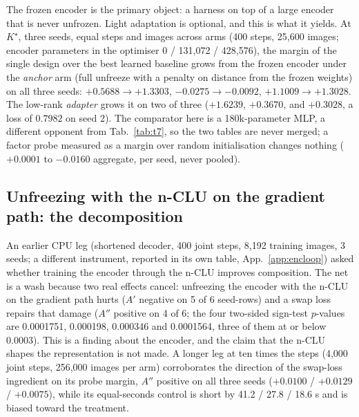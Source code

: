 \documentclass{article} %
\newcommand{\Kstar}{\ensuremath{K^{\star}}}
\begin{document}
The frozen encoder is the primary object: a harness on top of a large encoder that is never
unfrozen. Light adaptation is optional, and this is what it yields. At $\Kstar$, three seeds,
equal steps and images across arms (400 steps, 25,600 images; encoder parameters in the
optimiser 0 / 131,072 / 428,576), the margin of the single design over the best learned
baseline grows from the frozen encoder under the \emph{anchor} arm (full unfreeze with a
penalty on distance from the frozen weights) on all three seeds: $+0.5688\to+1.3303$,
$-0.0275\to-0.0092$, $+1.1009\to+1.3028$. The low-rank \emph{adapter} grows it on two of
three ($+1.6239$, $+0.3670$, and $+0.3028$, a loss of $0.7982$ on seed 2).
The comparator here is a 180k-parameter MLP, a different opponent from Tab.~\ref{tab:t7}, so
the two tables are never merged; a factor probe measured as a margin over random
initialisation changes nothing ($+0.0001$ to $-0.0160$ aggregate, per seed, never pooled).

\subsection*{Unfreezing with the n-CLU on the gradient path: the decomposition}

An earlier CPU leg (shortened decoder, 400 joint steps, 8,192 training images, 3 seeds; a
different instrument, reported in its own table, App.~\ref{app:encloop}) asked whether
training the encoder through the n-CLU improves composition. The net is a wash because two
real effects cancel: unfreezing the encoder with the n-CLU on the gradient path hurts ($A'$
negative on 5 of 6 seed-rows) and a swap loss repairs that damage ($A''$ positive on 4 of 6;
the four two-sided sign-test $p$-values are 0.0001751, 0.000198, 0.000346 and 0.0001564, three
of them at or below 0.0003). This is a finding about the encoder, and the claim
that the n-CLU shapes the representation is not made. %
A longer leg at ten times the steps (4,000 joint steps, 256,000 images per arm) corroborates
the direction of the swap-loss ingredient on its probe margin, $A''$ positive on all three
seeds ($+0.0100$ / $+0.0129$ / $+0.0075$), while its equal-seconds control is short by 41.2 /
27.8 / 18.6 s and is biased toward the treatment. %
\end{document}
